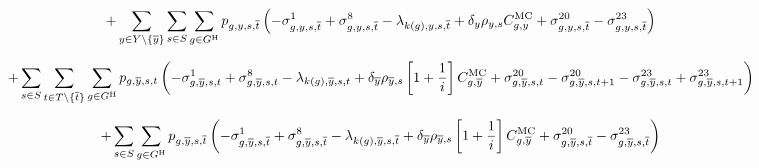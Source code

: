 \documentclass{article}
\begin{document}
\begin{equation}
+ \sum\limits_{\iYear \in \sYears \setminus \{\iYearTerminal\}}\sum\limits_{\iScenario \in \sScenarios} \sum\limits_{\iGenerator \in \sGeneratorsHydro} \vPower[\iGenerator,\iYear,\iScenario,\iIntervalTerminal]\left(-\dMinPowerOutput[\iGenerator,\iYear,\iScenario,\iIntervalTerminal] + \dMaxPowerOutputHydro[\iGenerator,\iYear,\iScenario,\iIntervalTerminal] - \dPowerBalance[k(\iGenerator),\iYear,\iScenario,\iIntervalTerminal] + \cDiscountRate \cScenarioDuration \cMarginalCost + \dRampRateUp[\iGenerator,\iYear,\iScenario,\iIntervalTerminal] - \dRampRateDown[\iGenerator,\iYear,\iScenario,\iIntervalTerminal]
\right)
\end{equation}

\begin{equation}
+ \sum\limits_{\iScenario \in \sScenarios} \sum\limits_{\iInterval \in \sIntervals \setminus \{\iIntervalTerminal\}} \sum\limits_{\iGenerator \in \sGeneratorsHydro} \vPower[\iGenerator,\iYearTerminal,\iScenario,\iInterval] \left(-\dMinPowerOutput[\iGenerator,\iYearTerminal,\iScenario,\iInterval] + \dMaxPowerOutputHydro[\iGenerator,\iYearTerminal,\iScenario,\iInterval] - \dPowerBalance[k(\iGenerator),\iYearTerminal,\iScenario,\iInterval] + \cDiscountRate[\iYearTerminal] \cScenarioDuration[\iYearTerminal,\iScenario] \left[1 + \frac{1}{\cInterestRate}\right] \cMarginalCost[\iGenerator,\iYearTerminal] + \dRampRateUp[\iGenerator,\iYearTerminal,\iScenario,\iInterval] - \dRampRateUp[\iGenerator,\iYearTerminal,\iScenario,\iInterval + 1] - \dRampRateDown[\iGenerator,\iYearTerminal,\iScenario,\iInterval] + \dRampRateDown[\iGenerator,\iYearTerminal,\iScenario,\iInterval + 1]
\right)
\end{equation}

\begin{equation}
+ \sum\limits_{\iScenario \in \sScenarios} \sum\limits_{\iGenerator \in \sGeneratorsHydro} \vPower[\iGenerator,\iYearTerminal,\iScenario,\iIntervalTerminal] \left(-\dMinPowerOutput[\iGenerator,\iYearTerminal,\iScenario,\iIntervalTerminal] + \dMaxPowerOutputHydro[\iGenerator,\iYearTerminal,\iScenario,\iIntervalTerminal] - \dPowerBalance[k(\iGenerator),\iYearTerminal,\iScenario,\iIntervalTerminal] + \cDiscountRate[\iYearTerminal] \cScenarioDuration[\iYearTerminal,\iScenario] \left[1 + \frac{1}{\cInterestRate}\right] \cMarginalCost[\iGenerator,\iYearTerminal] + \dRampRateUp[\iGenerator,\iYearTerminal,\iScenario,\iIntervalTerminal] - \dRampRateDown[\iGenerator,\iYearTerminal,\iScenario,\iIntervalTerminal]
\right)
\end{equation}
\end{document}
